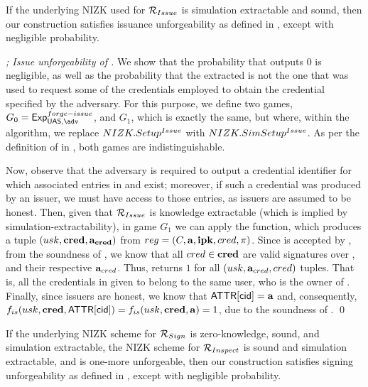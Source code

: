 \begin{theorem}
  \label{thm:issue-forge-uas}
  If the underlying NIZK used for $\mathcal{R}_{Issue}$ is simulation extractable
  and sound, then our \CUASGen construction satisfies issuance unforgeability as
  defined in , except with negligible probability.
\end{theorem}

\begin{proof}[; Issue unforgeability of \CUASGen]
  We show that the probability that \fissue outputs $0$ is negligible, as well
  as the probability that the extracted \usk is not the one that was used to
  request some of the credentials employed to obtain the credential specified by
  the adversary.
  For this purpose, we define two games, $G_0=\ExpForgeIssue$, and $G_1$, which
  is exactly the same, but where, within the \Setup algorithm, we replace
  $NIZK.Setup^{Issue}$ with $NIZK.SimSetup^{Issue}$. As per the definition of
  \NIZK in , both games are indistinguishable.

  Now, observe that the adversary is required to output a credential
  identifier for which associated entries in \trans and \CRED exist; moreover,
  if such a credential was produced by an issuer, we must have access to those
  entries, as issuers are assumed to be honest.
  Then, given that $\mathcal{R}_{Issue}$ is knowledge extractable (which is implied
  by simulation-extractability), in game $G_1$
  we can apply the \NIZKExtract function, which produces a tuple $(usk,\mathbf{cred},
  \mathbf{a}_{\mathbf{cred}})$ from $reg = (C,\mathbf{a},\mathbf{ipk},cred,\pi)$.
  Since \NIZKproof is accepted by \ExtractIssue, from the soundness of \NIZK, we
  know that all $cred \in \mathbf{cred}$ are valid signatures over \usk, and their
  respective $\mathbf{a}_{cred}$. Thus, \IdentifyCred returns $1$ for all $(usk,
  \mathbf{a}_{cred},cred)$ tuples. That is, all the credentials in \scred given
  to \fissue belong to the same user, who is the owner of \usk.
  Finally, since issuers are honest, we know that $\mathsf{ATTR}[\mathsf{cid}] = \mathbf{a}$ and,
  consequently, $f_{is}(usk,\mathbf{cred},\mathsf{ATTR}[\mathsf{cid}]) = f_{is}(usk,\mathbf{cred},\mathbf{a})
  = 1$, due to the soundness of \NIZK.
  \qed
\end{proof}

\begin{theorem}
  \label{thm:sign-forge-uas}
  If the underlying NIZK scheme for $\mathcal{R}_{Sign}$ is zero-knowledge, sound,
  and simulation extractable, the NIZK scheme for $\mathcal{R}_{Inspect}$ is sound
  and simulation extractable, and \SBCM is one-more unforgeable, then our
  \CUASGen construction satisfies signing unforgeability as defined in
  , except with negligible probability.
\end{theorem}

